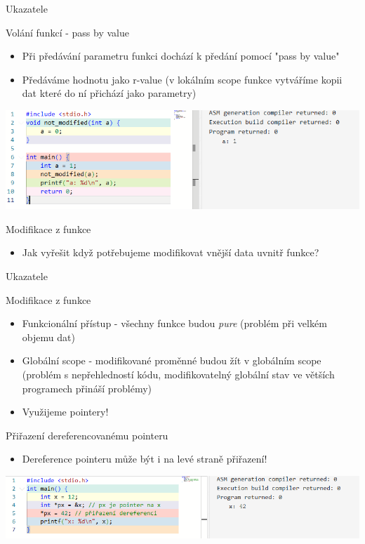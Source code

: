 \documentclass[9pt]{beamer}
\begin{document}
\begin{frame}{Ukazatele}
        \begin{block}{Volání funkcí - pass by value}
            \begin{itemize}
                \item Při předávání parametru funkci dochází k předání pomocí "pass by value"
                \item Předáváme hodnotu jako r-value (v lokálním scope funkce vytváříme kopii dat které do ní přichází jako parametry)
            \end{itemize}
        \end{block}
        \includegraphics[width=0.99\linewidth]{lekce20/pass_by_value.png}
        \pause
        \begin{block}{Modifikace z funkce}
            \begin{itemize}
                \item Jak vyřešit když potřebujeme modifikovat vnější data uvnitř funkce?
            \end{itemize}
        \end{block}
\end{frame}

\begin{frame}{Ukazatele}
    \begin{block}{Modifikace z funkce}
        \begin{itemize}
            \item Funkcionální přístup - všechny funkce budou \textit{pure} (problém při velkém objemu dat)
            \item Globální scope - modifikované proměnné budou žít v globálním scope (problém s nepřehledností kódu, modifikovatelný globální stav ve větších programech přináší problémy)
            \item Využijeme pointery!
        \end{itemize}
    \end{block}
    \pause
    \begin{block}{Přiřazení dereferencovanému pointeru}
        \begin{itemize}
            \item Dereference pointeru může být i na levé straně přiřazení!
        \end{itemize}
    \end{block}
    \includegraphics[width=0.99\linewidth]{lekce20/dereference_assignment.png}
\end{frame}
\end{document}
